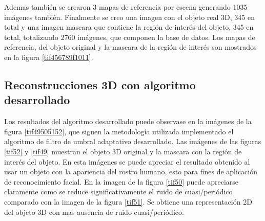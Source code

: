 \documentclass[10pt,letterpaper]{article}
\begin{document}
Ademas también se crearon 3 mapas de referencia por escena generando 1035 imágenes también. Finalmente se creo una imagen con el objeto real 3D, 345 en total y una imagen mascara que contiene la región de interés del objeto, 345 en total, totalizando 2760 imágenes, que componen la base de datos. Los mapas de referencia, del objeto original y la mascara de la región de interés son mostrados en la figura \ref{tif456789f1011}.

\subsection{Reconstrucciones 3D con algoritmo desarrollado}
Los resultados del algoritmo desarrollado puede observase en la imágenes de la figura \ref{tif49505152}, que siguen la metodología utilizada implementado el algoritmo de filtro de umbral adaptativo desarrollado. Las imágenes de las figuras \ref{tif52} y \ref{tif49} muestran el objeto 3D original y la mascara con la región de interés del objeto. En esta imágenes se puede apreciar el resultado obtenido al usar un objeto con la apariencia del rostro humano, esto para fines de aplicación de reconocimiento facial. En la imagen de la figura \ref{tif50} puede apreciarse claramente como se reduce significativamente el ruido de cuasi/periódico comparado con la imagen de la figura \ref{tif51}. Se obtiene una representación 2D del objeto 3D con mas ausencia de ruido cuasi/periódico.
\end{document}
